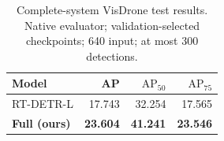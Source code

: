 
\begin{table}[t]
\centering
\caption{Complete-system VisDrone test results. Native evaluator; validation-selected checkpoints; 640 input; at most 300 detections.}
\label{tab:native}
\small
\begin{tabular*}{\columnwidth}{@{\extracolsep{\fill}}lrrr@{}}
\toprule
Model & AP & $\mathrm{AP}_{50}$ & $\mathrm{AP}_{75}$ \\
\midrule
RT-DETR-L & 17.743 & 32.254 & 17.565 \\
\textbf{Full (ours)} & \textbf{23.604} & \textbf{41.241} & \textbf{23.546} \\
\bottomrule
\end{tabular*}
\end{table}
